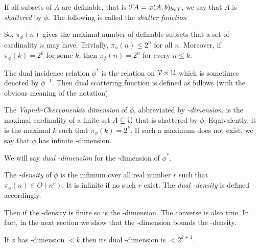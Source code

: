 \documentclass[sputnik.tex]{subfiles}
\begin{document}
If all subsets of $A$ are definable, that is $\EuScript P A=\varphi(A,b)_{b\in\EuScript V}$, we say that $A$ is \emph{shattered\/} by $\phi$.
The following is called the \emph{shatter function\/}




So, $\pi_\phi(n)$ gives the maximal number of definable subsets that a set of cardinality $n$ may have.
Trivially, $\pi_\phi(n)\le2^n$ for all $n$.
Moreover, if $\pi_\phi(k)=2^k$ for some $k$, then $\pi_\phi(n)=2^n$ for every $n\le k$.

The dual incidence relation $\phi^*$ is the relation on $\EuScript V\times\EuScript U$ which is sometimes denoted by $\phi^{-1}$.
Then dual scattering function is defined as follows (with the obvious meaning of the notation) 



\begin{definition}\label{def_VCdim}
The \emph{Vapnik-Cher\-vo\-nen\-kis dimension\/} of $\phi$, abbreviated by \emph{\vc-dimension}, is the maximal cardinality of a finite set $A\subseteq\EuScript U$ that is shattered by $\phi$.
Equivalently, it is the maximal $k$ such that $\pi_\phi(k)=2^k$.
If such a maximum does not exist,
we say that $\phi$ has infinite \vc-dimension.

We will say \emph{dual \vc-dimension\/} for the \vc-dimension of $\phi^*$.

The \emph{\vc-density\/} of $\phi$ is the infimum over all real number $r$ such that $\pi_\phi(n)\in O(n^r)$.
It is infinite if no such $r$ exist.
The  \emph{dual \vc-density\/} is defined accordingly.\QED
\end{definition}


Then if the \vc-density is finite so is the \vc-dimension.
The converse is also true.
In fact, in the next section we show that the \vc-dimension bounds the \vc-density.

\begin{proposition}
If $\phi$ has \vc-dimension $< k$ then its dual \vc-dimension is $< 2^{k+1}$.
\end{proposition}
\end{document}
